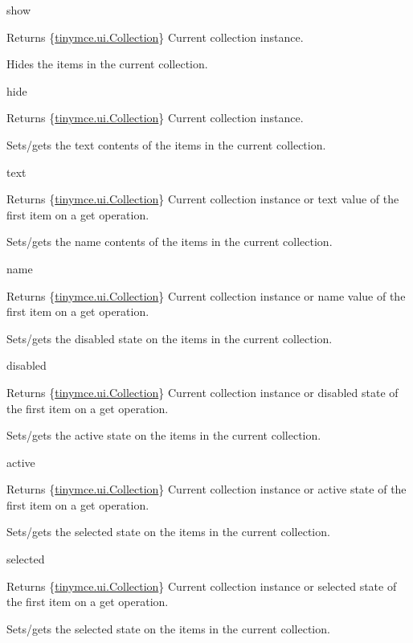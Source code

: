show \begin{DoxyReturn}{Returns}
\{\hyperlink{classtinymce_1_1ui_1_1_collection}{tinymce.\+ui.\+Collection}\} Current collection instance.
\end{DoxyReturn}
Hides the items in the current collection.

hide \begin{DoxyReturn}{Returns}
\{\hyperlink{classtinymce_1_1ui_1_1_collection}{tinymce.\+ui.\+Collection}\} Current collection instance.
\end{DoxyReturn}
Sets/gets the text contents of the items in the current collection.

text \begin{DoxyReturn}{Returns}
\{\hyperlink{classtinymce_1_1ui_1_1_collection}{tinymce.\+ui.\+Collection}\} Current collection instance or text value of the first item on a get operation.
\end{DoxyReturn}
Sets/gets the name contents of the items in the current collection.

name \begin{DoxyReturn}{Returns}
\{\hyperlink{classtinymce_1_1ui_1_1_collection}{tinymce.\+ui.\+Collection}\} Current collection instance or name value of the first item on a get operation.
\end{DoxyReturn}
Sets/gets the disabled state on the items in the current collection.

disabled \begin{DoxyReturn}{Returns}
\{\hyperlink{classtinymce_1_1ui_1_1_collection}{tinymce.\+ui.\+Collection}\} Current collection instance or disabled state of the first item on a get operation.
\end{DoxyReturn}
Sets/gets the active state on the items in the current collection.

active \begin{DoxyReturn}{Returns}
\{\hyperlink{classtinymce_1_1ui_1_1_collection}{tinymce.\+ui.\+Collection}\} Current collection instance or active state of the first item on a get operation.
\end{DoxyReturn}
Sets/gets the selected state on the items in the current collection.

selected \begin{DoxyReturn}{Returns}
\{\hyperlink{classtinymce_1_1ui_1_1_collection}{tinymce.\+ui.\+Collection}\} Current collection instance or selected state of the first item on a get operation.
\end{DoxyReturn}
Sets/gets the selected state on the items in the current collection.

